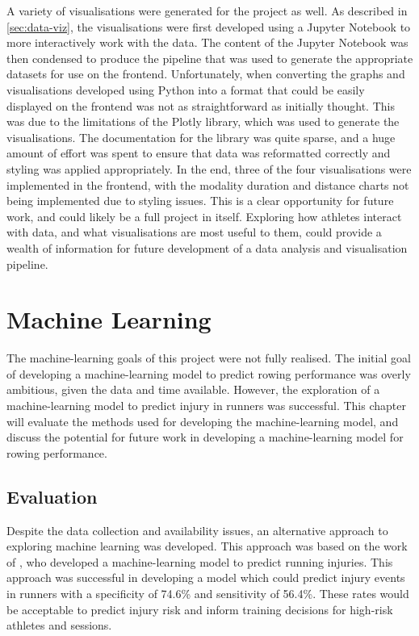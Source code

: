 A variety of visualisations were generated for the project as well. As described in \autoref{sec:data-viz}, the visualisations were first developed using a Jupyter Notebook to more interactively work with the data. The content of the Jupyter Notebook was then condensed to produce the pipeline that was used to generate the appropriate datasets for use on the frontend. Unfortunately, when converting the graphs and visualisations developed using Python into a format that could be easily displayed on the frontend was not as straightforward as initially thought. This was due to the limitations of the Plotly library, which was used to generate the visualisations. The documentation for the library was quite sparse, and a huge amount of effort was spent to ensure that data was reformatted correctly and styling was applied appropriately. In the end, three of the four visualisations were implemented in the frontend, with the modality duration and distance charts not being implemented due to styling issues. This is a clear opportunity for future work, and could likely be a full project in itself. Exploring how athletes interact with data, and what visualisations are most useful to them, could provide a wealth of information for future development of a data analysis and visualisation pipeline.

\section{Machine Learning}
The machine-learning goals of this project were not fully realised. The initial goal of developing a machine-learning model to predict rowing performance was overly ambitious, given the data and time available. However, the exploration of a machine-learning model to predict injury in runners was successful. This chapter will evaluate the methods used for developing the machine-learning model, and discuss the potential for future work in developing a machine-learning model for rowing performance.

\subsection{Evaluation}
Despite the data collection and availability issues, an alternative approach to exploring machine learning was developed. This approach was based on the work of \textcite{Lovdal2021}, who developed a machine-learning model to predict running injuries. This approach was successful in developing a model which could predict injury events in runners with a specificity of 74.6\% and sensitivity of 56.4\%. These rates would be acceptable to predict injury risk and inform training decisions for high-risk athletes and sessions.  

